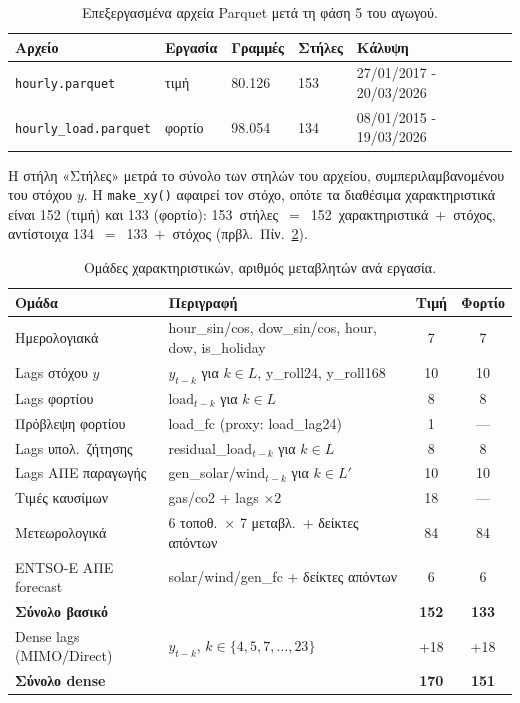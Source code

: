 \begin{table}[htbp]
\centering
\caption{Επεξεργασμένα αρχεία Parquet μετά τη φάση 5 του αγωγού.}
\label{tab:parquet_files}
\small
\begin{tabular}{lllll}
\toprule
Αρχείο & Εργασία & Γραμμές & Στήλες & Κάλυψη \\
\midrule
\texttt{hourly.parquet}       & τιμή   & 80.126 & 153 & 27/01/2017 - 20/03/2026 \\
\texttt{hourly\_load.parquet} & φορτίο & 98.054 & 134 & 08/01/2015 - 19/03/2026 \\
\bottomrule
\end{tabular}

\smallskip
{\footnotesize Η στήλη «Στήλες» μετρά το σύνολο των στηλών του αρχείου,
συμπεριλαμβανομένου του στόχου $y$. Η \texttt{make\_xy()} αφαιρεί τον στόχο,
οπότε τα διαθέσιμα χαρακτηριστικά είναι 152 (τιμή) και 133 (φορτίο):
\mbox{153 στήλες $=$ 152 χαρακτηριστικά $+$ στόχος}, αντίστοιχα
\mbox{134 $=$ 133 $+$ στόχος} (πρβλ.\ Πίν.~\ref{tab:features_summary}).}
\end{table}

\begin{table}[htbp]
\centering
\caption{Ομάδες χαρακτηριστικών, αριθμός μεταβλητών ανά εργασία.}
\label{tab:features_summary}
\begin{tabular}{p{4cm}p{6.5cm}cc}
\toprule
Ομάδα & Περιγραφή & Τιμή & Φορτίο \\
\midrule
Ημερολογιακά & hour\_sin/cos, dow\_sin/cos, hour, dow, is\_holiday & 7 & 7 \\
Lags στόχου $y$ & $y_{t-k}$ για $k \in L$, y\_roll24, y\_roll168 & 10 & 10 \\
Lags φορτίου & $\text{load}_{t-k}$ για $k \in L$ & 8 & 8 \\
Πρόβλεψη φορτίου & load\_fc (proxy: load\_lag24) & 1 & --- \\
Lags υπολ.\ ζήτησης & residual\_load$_{t-k}$ για $k \in L$ & 8 & 8 \\
Lags ΑΠΕ παραγωγής & gen\_solar/wind$_{t-k}$ για $k \in L'$ & 10 & 10 \\
Τιμές καυσίμων & gas/co2 + lags $\times 2$ & 18 & --- \\
Μετεωρολογικά & 6 τοποθ.\ × 7 μεταβλ.\ + δείκτες απόντων & 84 & 84 \\
ENTSO-E ΑΠΕ forecast & solar/wind/gen\_fc + δείκτες απόντων & 6 & 6 \\
\midrule
\textbf{Σύνολο βασικό} & & \textbf{152} & \textbf{133} \\
Dense lags (MIMO/Direct) & $y_{t-k}$, $k \in \{4,5,7,\ldots,23\}$ & +18 & +18 \\
\textbf{Σύνολο dense} & & \textbf{170} & \textbf{151} \\
\bottomrule
\end{tabular}
\end{table}


